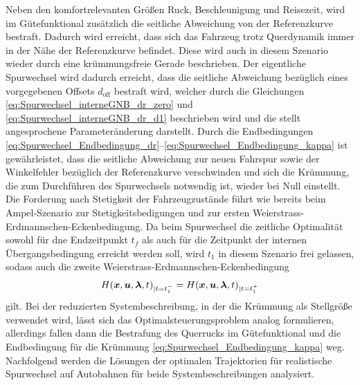 Neben den komfortrelevanten Größen Ruck, Beschleunigung und Reisezeit, wird im Gütefunktional zusätzlich die seitliche Abweichung von der Referenzkurve bestraft. Dadurch wird erreicht, dass sich das Fahrzeug trotz Querdynamik immer in der Nähe der Referenzkurve befindet. Diese wird auch in diesem Szenario wieder durch eine krümmungsfreie Gerade beschrieben. Der eigentliche Spurwechsel wird dadurch erreicht, dass die seitliche Abweichung bezüglich eines vorgegebenen Offsets $d_{\textrm{off}}$ bestraft wird, welcher durch die Gleichungen \eqref{eq:Spurwechsel_interneGNB_dr_zero} und \eqref{eq:Spurwechsel_interneGNB_dr_d1} beschrieben wird und die stellt angesprochene Parameteränderung darstellt. Durch die Endbedingungen \eqref{eq:Spurwechsel_Endbedingung_dr}--\eqref{eq:Spurwechsel_Endbedingung_kappa} ist gewährleistet, dass die seitliche Abweichung zur neuen Fahrspur sowie der Winkelfehler bezüglich der Referenzkurve verschwinden und sich die Krümmung, die zum Durchführen des Spurwechsels notwendig ist, wieder bei Null einstellt. Die Forderung nach Stetigkeit der Fahrzeugzustände führt wie bereits beim Ampel-Szenario zur Stetigkeitsbedigungen und zur ersten Weierstrass-Erdmannschen-Eckenbedingung. Da beim Spurwechsel die zeitliche Optimalität sowohl für dne Endzeitpunkt $t_f$ als auch für die Zeitpunkt der internen Übergangsbedingung erreicht werden soll, wird $t_1$ in diesem Szenario frei gelassen, sodass auch die zweite Weierstrass-Erdmannschen-Eckenbedingung 
\begin{equation}
H(\boldsymbol{x},\boldsymbol{u},\boldsymbol{\lambda},t)_{|t=t_1^-} = H(\boldsymbol{x},\boldsymbol{u},\boldsymbol{\lambda},t)_{|t=t_1^+} 
\end{equation}
gilt. Bei der reduzierten Systembeschreibung, in der die Krümmung als Stellgröße verwendet wird, lässt sich das Optimalsteuerungsproblem analog formulieren, allerdings fallen dann die Bestrafung des Querrucks im Gütefunktional und die Endbedingung für die Krümmung \eqref{eq:Spurwechsel_Endbedingung_kappa} weg. Nachfolgend werden die Lösungen der optimalen Trajektorien für realistische Spurwechsel auf Autobahnen für beide Systembeschreibungen analysiert.

